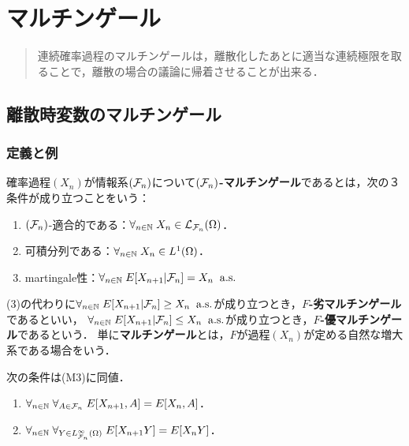 \documentclass[uplatex,dvipdfmx]{jsreport}
\begin{document}
\chapter{マルチンゲール}

\begin{quotation}
    連続確率過程のマルチンゲールは，離散化したあとに適当な連続極限を取ることで，離散の場合の議論に帰着させることが出来る．
\end{quotation}

\section{離散時変数のマルチンゲール}

\subsection{定義と例}

\begin{definition}
    確率過程$(X_n)$が情報系$(\mathcal{F}_n)$について\textbf{$(\mathcal{F}_n)$-マルチンゲール}であるとは，次の３条件が成り立つことをいう：
    \begin{enumerate}[({M}1)]
        \item $(\mathcal{F}_n)$-適合的である：$\forall_{n\in\mathbb{N}}\;X_n\in\mathcal{L}_{\mathcal{F}_n}(\Omega)$．
        \item 可積分列である：$\forall_{n\in\mathbb{N}}\;X_n\in L^1(\Omega)$．
        \item martingale性：$\forall_{n\in\mathbb{N}}\;E[X_{n+1}|\mathcal{F}_n]=X_n\;\;\mathrm{a.s.}$
    \end{enumerate}
    (3)の代わりに$\forall_{n\in\mathbb{N}}\;E[X_{n+1}|\mathcal{F}_n]\ge X_n\;\;\mathrm{a.s.}$が成り立つとき，\textbf{$F$-劣マルチンゲール}であるといい，
    $\forall_{n\in\mathbb{N}}\;E[X_{n+1}|\mathcal{F}_n]\le X_n\;\;\mathrm{a.s.}$が成り立つとき，\textbf{$F$-優マルチンゲール}であるという．
    単に\textbf{マルチンゲール}とは，$F$が過程$(X_n)$が定める自然な増大系である場合をいう．
\end{definition}
\begin{lemma}[定義の特徴付け]
    次の条件は(M3)に同値．
    \begin{enumerate}
        \item $\forall_{n\in\mathbb{N}}\;\forall_{A\in\mathcal{F}_n}\;E[X_{n+1},A]=E[X_n,A]$．
        \item $\forall_{n\in\mathbb{N}}\;\forall_{Y\in L^\infty_{\mathcal{F}_n}(\Omega)}\;E[X_{n+1}Y]=E[X_nY]$．
    \end{enumerate}
\end{lemma}
\end{document}
